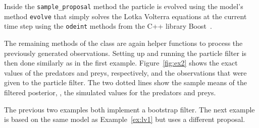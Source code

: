 \begin{example}
  Inside the \texttt{sample\_proposal} method the particle is evolved
  using the model's method \texttt{evolve} that simply solves the
  Lotka Volterra equations at the current time step using the
  \texttt{odeint} methods from the C++ library Boost~\cite{boost}.

  The remaining methods of the class are again helper functions to
  process the previously generated observations. Setting up and
  running the particle filter is then done similarly as in the first
  example. Figure~\ref{fig:ex2} shows the exact values of the
  predators and preys, respectively, and the observations that were
  given to the particle filter. The two dotted lines show the sample
  means of the filtered posterior, \ie, the simulated values for the
  predators and preys.

\end{example}

The previous two examples both implement a bootstrap filter. The next
example is based on the same model as Example~\ref{ex:lv1} but uses a
different proposal.

